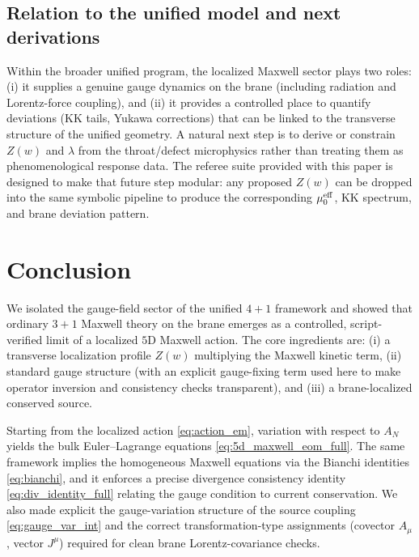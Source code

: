 \documentclass[11pt]{article}
\newcommand{\A}{A}
\newcommand{\J}{J}
\newcommand{\Z}{Z}
\newcommand{\lam}{\lambda}      %
\newcommand{\mueff}{\mu_0^{\rm eff}}
\begin{document}
\subsection{Relation to the unified model and next derivations}
Within the broader unified program, the localized Maxwell sector plays two roles:
(i) it supplies a genuine gauge dynamics on the brane (including radiation and
Lorentz-force coupling), and (ii) it provides a controlled place to quantify
deviations (KK tails, Yukawa corrections) that can be linked to the transverse
structure of the unified geometry. A natural next step is to derive or constrain
\(\Z(w)\) and \(\lam\) from the throat/defect microphysics rather than treating
them as phenomenological response data. The referee suite provided with this
paper is designed to make that future step modular: any proposed \(\Z(w)\) can be
dropped into the same symbolic pipeline to produce the corresponding
\(\mueff\), KK spectrum, and brane deviation pattern.

\section{Conclusion}
\label{sec:conclusion}

We isolated the gauge-field sector of the unified \(4+1\) framework and showed
that ordinary \(3+1\) Maxwell theory on the brane emerges as a controlled,
script-verified limit of a localized \(5\)D Maxwell action. The core ingredients
are: (i) a transverse localization profile \(\Z(w)\) multiplying the Maxwell
kinetic term, (ii) standard gauge structure (with an explicit gauge-fixing term
used here to make operator inversion and consistency checks transparent), and
(iii) a brane-localized conserved source.

Starting from the localized action \cref{eq:action_em}, variation with respect to
\(\A_N\) yields the bulk Euler--Lagrange equations
\cref{eq:5d_maxwell_eom_full}. The same framework implies the homogeneous Maxwell
equations via the Bianchi identities \cref{eq:bianchi}, and it enforces a precise
divergence consistency identity \cref{eq:div_identity_full} relating the gauge
condition to current conservation. We also made explicit the gauge-variation
structure of the source coupling \cref{eq:gauge_var_int} and the correct
transformation-type assignments (covector \(\A_\mu\), vector \(\J^\mu\)) required
for clean brane Lorentz-covariance checks.
\end{document}
